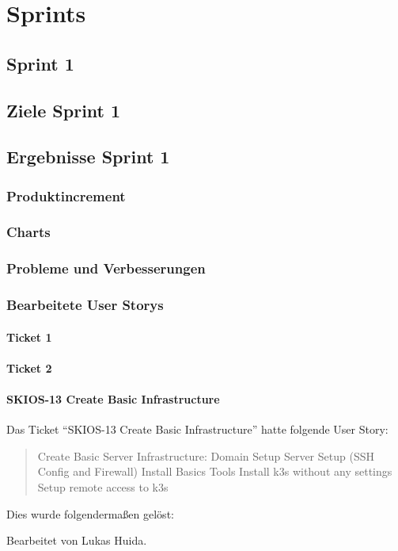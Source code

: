 
\chapter{Sprints}

\section{Sprint 1}

\section{Ziele Sprint 1}

\section{Ergebnisse Sprint 1}

\subsection{Produktincrement}
\subsection{Charts}

\subsection{Probleme und Verbesserungen}


\subsection{Bearbeitete User Storys}

\subsubsection{Ticket 1}

\subsubsection{Ticket 2}

\subsubsection{SKIOS-13 Create Basic Infrastructure}
Das Ticket \enquote{SKIOS-13 Create Basic Infrastructure} hatte folgende User Story:
\begin{quotation}
    Create Basic Server Infrastructure:
    Domain Setup
    Server Setup (SSH Config and Firewall)
    Install Basics Tools
    Install k3s without any settings
    Setup remote access to k3s
\end{quotation}
Dies wurde folgendermaßen gelöst:
\begin{quotation}
    
\end{quotation}
Bearbeitet von Lukas Huida.

